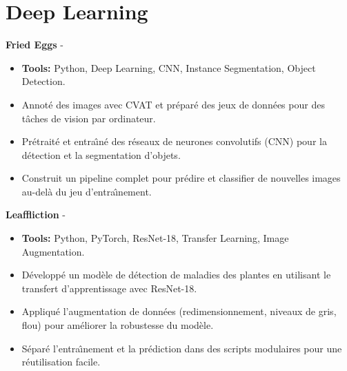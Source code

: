 \documentclass[a4paper,11pt]{article}%
\begin{document}
\section*{Deep Learning}%
%
\noindent \textbf{Fried Eggs} - \href{https://github.com/sboof911/Fried-eggs}{{}}%
\begin{itemize}[leftmargin=2em,parsep=0pt,topsep=1em]%
\item[] \textbf{Tools:} Python, Deep Learning, CNN, Instance Segmentation, Object Detection.%
\item Annot\'e des images avec CVAT et pr\'epar\'e des jeux de donn\'ees pour des t\^aches de vision par ordinateur.%
\item Pr\'etrait\'e et entra{\^\i}n\'e des r\'eseaux de neurones convolutifs (CNN) pour la d\'etection et la segmentation d'objets.%
\item Construit un pipeline complet pour pr\'edire et classifier de nouvelles images au-del\`a du jeu d'entra{\^\i}nement.%
\end{itemize}%
%
\noindent \textbf{Leaffliction} - \href{https://github.com/sboof911/Leaffliction}{{}}%
\begin{itemize}[leftmargin=2em,parsep=0pt,topsep=1em]%
\item[] \textbf{Tools:} Python, PyTorch, ResNet-18, Transfer Learning, Image Augmentation.%
\item D\'evelopp\'e un mod\`ele de d\'etection de maladies des plantes en utilisant le transfert d'apprentissage avec ResNet-18.%
\item Appliqu\'e l'augmentation de donn\'ees (redimensionnement, niveaux de gris, flou) pour am\'eliorer la robustesse du mod\`ele.%
\item S\'epar\'e l'entra{\^\i}nement et la pr\'ediction dans des scripts modulaires pour une r\'eutilisation facile.%
\end{itemize}%
%
\end{document}
